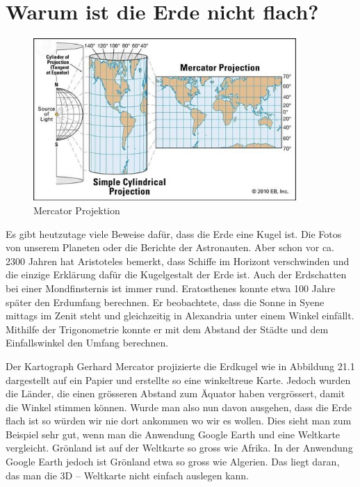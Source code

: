 

\section{Warum ist die Erde nicht flach?}

\begin{figure}
	\begin{center}
		\includegraphics[width=10cm]{papers/nav/bilder/projektion.png}
		\caption[Mercator Projektion]{Mercator Projektion}
	\end{center}	
\end{figure}

Es gibt heutzutage viele Beweise dafür, dass die Erde eine Kugel ist. 
Die Fotos von unserem	Planeten oder die Berichte der Astronauten. 
Aber schon vor ca. 2300 Jahren hat Aristoteles bemerkt, dass Schiffe im Horizont verschwinden und die einzige Erklärung dafür die Kugelgestalt der Erde ist.
Auch der Erdschatten bei einer Mondfinsternis ist immer rund.
Eratosthenes konnte etwa 100 Jahre später den Erdumfang berechnen. 
Er beobachtete, dass die Sonne in Syene mittags im Zenit steht und gleichzeitig in Alexandria unter einem Winkel einfällt. 
Mithilfe der Trigonometrie konnte er mit dem Abstand der Städte und dem Einfallswinkel den Umfang berechnen.

Der Kartograph Gerhard Mercator projizierte die Erdkugel wie in Abbildung 21.1 dargestellt auf ein Papier und erstellte so eine winkeltreue Karte. 
Jedoch wurden die Länder, die einen grösseren Abstand zum Äquator haben vergrössert, damit die Winkel stimmen können. 
Wurde man also nun davon ausgehen, dass die Erde flach ist so würden wir nie dort ankommen wo wir es wollen.
Dies sieht man zum Beispiel sehr gut, wenn man die Anwendung Google Earth und eine Weltkarte vergleicht. 
Grönland ist auf der Weltkarte so gross wie Afrika. 
In der Anwendung Google Earth jedoch ist Grönland etwa so gross wie Algerien. 
Das liegt daran, das man die 3D – Weltkarte nicht einfach auslegen kann. 

